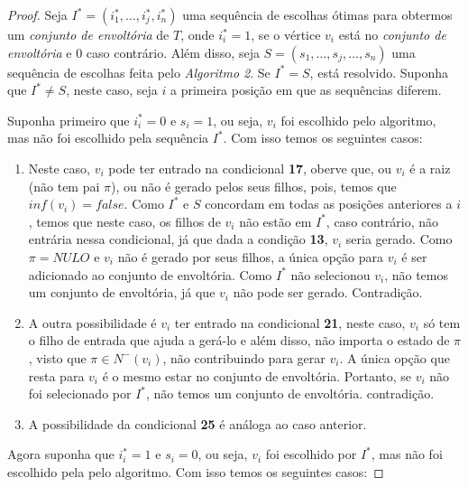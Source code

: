 \begin{proof}
  Seja $I^* = (i^*_1, \ldots, i^*_j, i^*_n)$ uma sequência de escolhas ótimas para obtermos um \emph{conjunto de envoltória} de $T$, onde $i^*_i = 1$, se o vértice $v_i$ está no \emph{conjunto de envoltória} e 0 caso contrário. Além disso, seja $S = (s_1, \ldots, s_j, \ldots, s_n)$ uma sequência de escolhas feita pelo \emph{Algoritmo 2}. Se $I^* = S$, está resolvido. Suponha que $I^* \neq S$, neste caso, seja $i$ a primeira posição em que as sequências diferem.

  Suponha primeiro que $i^*_i = 0$ e $s_i = 1$, ou seja, $v_i$ foi escolhido pelo algoritmo, mas não foi escolhido pela sequência $I^*$. Com isso temos os seguintes casos:

  \begin{enumerate}
    \item Neste caso, $v_i$ pode ter entrado na condicional \textbf{17}, oberve que, ou $v_i$ é a raiz (não tem pai $\pi$), ou não é gerado pelos seus filhos, pois, temos que $inf(v_i) = false$. Como $I^*$ e $S$ concordam em todas as posições anteriores a $i$, temos que neste caso, os filhos de $v_i$ não estão em $I^*$, caso contrário, não entrária nessa condicional, já que dada a condição \textbf{13}, $v_i$ seria gerado. Como $\pi = NULO$ e $v_i$ não é gerado por seus filhos, a única opção para $v_i$ é ser adicionado ao conjunto de envoltória. Como $I^*$ não selecionou $v_i$, não temos um conjunto de envoltória, já que $v_i$ não pode ser gerado. Contradição.
    \item A outra possibilidade é $v_i$ ter entrado na condicional \textbf{21}, neste caso, $v_i$ só tem o filho de entrada que ajuda a gerá-lo e além disso, não importa o estado de $\pi$, visto que $\pi \in N^-(v_i)$, não contribuindo para gerar $v_i$. A única opção que resta para $v_i$ é o mesmo estar no conjunto de envoltória. Portanto, se $v_i$ não foi selecionado por $I^*$, não temos um conjunto de envoltória. contradição.
    \item A possibilidade da condicional \textbf{25} é análoga ao caso anterior.
  \end{enumerate}

  Agora suponha que $i^*_i = 1$ e $s_i = 0$, ou seja, $v_i$ foi escolhido por $I^*$, mas não foi escolhido pela pelo algoritmo. Com isso temos os seguintes casos:


\end{proof}
